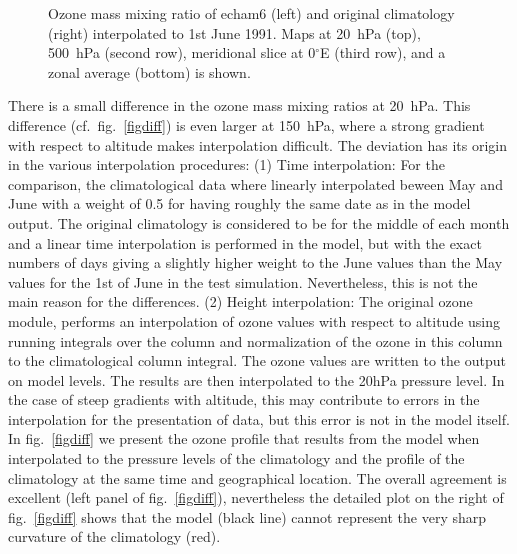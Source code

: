 \begin{appendix}
\begin{figure}[hbt]
\vspace{-4cm}
\pcteight
{\vspace{-1.6cm}}
{\vspace{-1.6cm}}
{\vspace{-1.6cm}\rule{0mm}{3.5cm}}
{\vspace{-1.6cm}}
{\vspace{-1.6cm}\rule{0mm}{3.5cm}}
{\vspace{-1.6cm}}
{\rule{0mm}{3.7cm}}
{}
\caption{Ozone mass mixing ratio of echam6 (left) and original
  climatology (right) interpolated to 1st June 1991. Maps at 20~hPa
  (top), 500~hPa (second row), meridional slice at 0$^\circ$E (third
  row), and a zonal average (bottom) is shown.}\label{figozone}
\end{figure}

There is a small difference in the ozone mass mixing ratios at 20~hPa.
This difference (cf.~fig.~\ref{figdiff}) is even larger at 150~hPa,
where a strong gradient with respect to altitude makes interpolation
difficult. The deviation has its origin in the
various interpolation procedures: (1) Time interpolation: For the
comparison, the climatological data where linearly interpolated beween
May and June with a weight of 0.5 for having roughly the same date as
in the model output.
The original climatology is considered to be for the middle of each
month and a linear time interpolation is performed in the model, but
with the exact numbers of days giving a slightly higher weight to the
June values than the May values for the 1st of June in the test
simulation. Nevertheless, this is not the main reason for the differences. 
(2) Height interpolation: The original ozone module, performs an
interpolation of ozone values with respect to altitude using running
integrals over the column and normalization of the ozone in this
column to the climatological column integral. The ozone
values are written to the output on model levels. The results are then
interpolated to the 20hPa pressure level. In the case of steep
gradients with altitude, this may contribute to errors in the
interpolation for the presentation of data, but this error is not in
the model itself. In fig.~\ref{figdiff} we present the ozone profile
that results from the model when interpolated to the pressure levels
of the climatology and the profile of the climatology at the same time
and geographical location. The overall agreement is excellent (left
panel of fig.~\ref{figdiff}), nevertheless the detailed plot on the
right of fig.~\ref{figdiff} shows that the model (black line) cannot
represent the very sharp curvature of the climatology (red).
 

\end{appendix}
